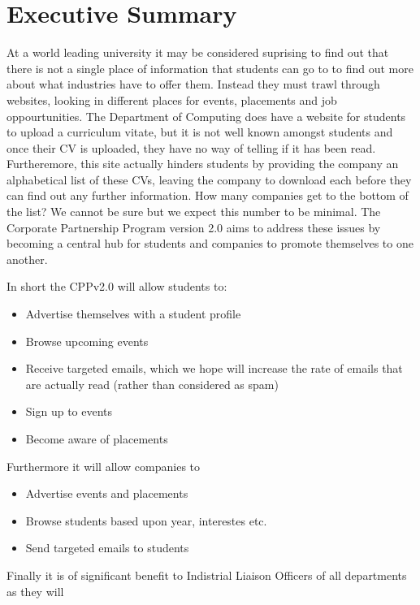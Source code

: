 \section{Executive Summary}
At a world leading university it may be considered suprising to find out that there is not a single place of information that students can go to to find out more about what industries have to offer them. Instead they must trawl through websites, looking in different places for events, placements and job oppourtunities.
The Department of Computing does have a website for students to upload a curriculum vitate, but it is not well known amongst students and once their CV is uploaded, they have no way of telling if it has been read.
Furtheremore, this site actually hinders students by providing the company an alphabetical list of these CVs, leaving the company to download each before they can find out any further information. How many companies get to the bottom of the list? We cannot be sure but we expect this number to be minimal.
The Corporate Partnership Program version 2.0 aims to address these issues by becoming a central hub for students and companies to promote themselves to one another.

In short the CPPv2.0 will allow students to:

\begin{itemize}
  \item Advertise themselves with a student profile
  \item Browse upcoming events
  \item Receive targeted emails, which we hope will increase the rate of emails that are actually read (rather than considered as spam)
  \item Sign up to events
  \item Become aware of placements
\end{itemize}

Furthermore it will allow companies to

\begin{itemize}
  \item Advertise events and placements
  \item Browse students based upon year, interestes etc.
  \item Send targeted emails to students
\end{itemize}

Finally it is of significant benefit to Indistrial Liaison Officers of all departments as they will

